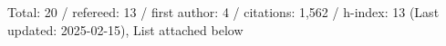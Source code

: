 Total: 20 / refereed: 13 / first author: 4 / citations: 1,562 / h-index: 13 (Last updated: 2025-02-15), List attached below